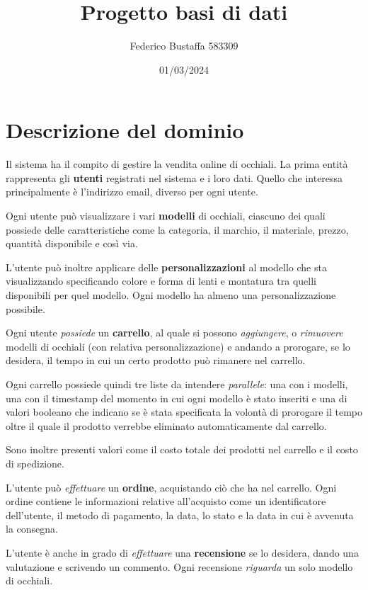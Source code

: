 \documentclass[12pt, a4paper]{article}
\title{Progetto basi di dati}
\author{Federico Bustaffa 583309}
\date{01/03/2024}
\begin{document}
\maketitle
\tableofcontents

\section{Descrizione del dominio}
Il sistema ha il compito di gestire la vendita online di occhiali. La prima entità rappresenta
gli \textbf{utenti} registrati nel sistema e i loro dati. Quello che interessa principalmente
è l'indirizzo email, diverso per ogni utente.

Ogni utente può visualizzare i vari \textbf{modelli} di occhiali, ciascuno dei quali possiede
delle caratteristiche come la categoria, il marchio, il materiale, prezzo, quantità disponibile
e così via.

L'utente può inoltre applicare delle \textbf{personalizzazioni} al modello che sta visualizzando
specificando colore e forma di lenti e montatura tra quelli disponibili per quel modello. Ogni
modello ha almeno una personalizzazione possibile.

Ogni utente \emph{possiede} un \textbf{carrello}, al quale si possono \emph{aggiungere}, o
\emph{rimuovere} modelli di occhiali (con relativa personalizzazione) e andando a prorogare, se
lo desidera, il tempo in cui un certo prodotto può rimanere nel carrello.

Ogni carrello possiede quindi tre liste da intendere \emph{parallele}: una con i modelli, una con
il timestamp del momento in cui ogni modello è stato inseriti e una di valori booleano che indicano
se è stata specificata la volontà di prorogare il tempo oltre il quale il prodotto verrebbe
eliminato automaticamente dal carrello.

Sono inoltre presenti valori come il costo totale dei prodotti nel carrello e il costo di
spedizione.

L'utente può \emph{effettuare} un \textbf{ordine}, acquistando ciò che ha nel carrello.
Ogni ordine contiene le informazioni relative all'acquisto come un identificatore dell'utente, il
metodo di pagamento, la data, lo stato e la data in cui è avvenuta la consegna.

L'utente è anche in grado di \emph{effettuare} una \textbf{recensione} se lo desidera, dando una
valutazione e scrivendo un commento. Ogni recensione \emph{riguarda} un solo modello di occhiali.
\end{document}
